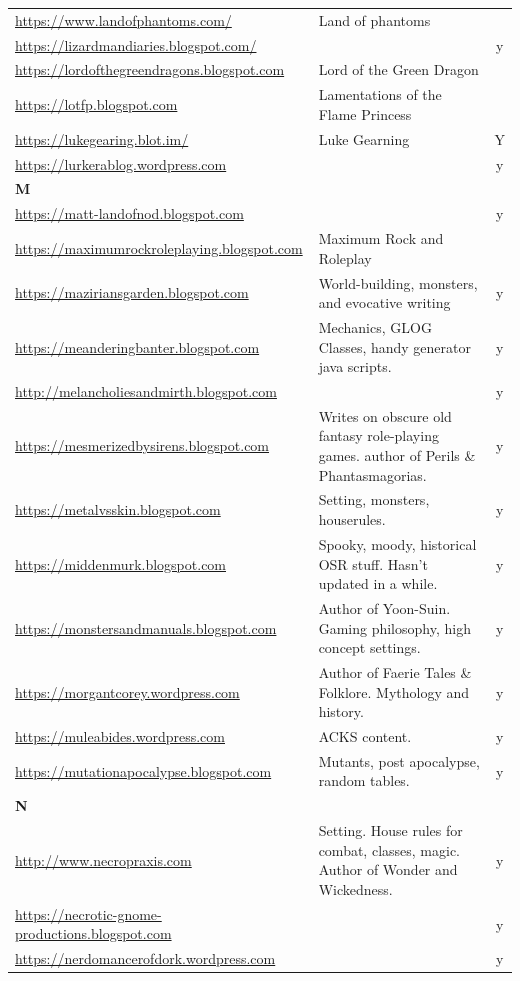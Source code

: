 \documentclass[a4paper, 11pt, twoside]{article}
\begin{document}
\begin{longtable}{p{6cm}p{8cm}c}
\url{https://www.landofphantoms.com/} & Land of phantoms & \\
\url{https://lizardmandiaries.blogspot.com/} &  & y\\
\url{https://lordofthegreendragons.blogspot.com} & Lord of the Green Dragon & \\
\url{https://lotfp.blogspot.com} & Lamentations of the Flame Princess & \\
\url{https://lukegearing.blot.im/} & Luke Gearning & Y\\
\url{https://lurkerablog.wordpress.com} &  & y\\
\textbf{M} &  & \\
\url{https://matt-landofnod.blogspot.com} &  & y\\
\url{https://maximumrockroleplaying.blogspot.com} & Maximum Rock and Roleplay & \\
\url{https://maziriansgarden.blogspot.com} & World-building, monsters, and evocative writing & y\\
\url{https://meanderingbanter.blogspot.com} & Mechanics, GLOG Classes, handy generator java scripts. & y\\
\url{http://melancholiesandmirth.blogspot.com} &  & y\\
\url{https://mesmerizedbysirens.blogspot.com} & Writes on obscure old fantasy role-playing games. author of Perils \& Phantasmagorias. & y\\
\url{https://metalvsskin.blogspot.com} & Setting, monsters, houserules. & y\\
\url{https://middenmurk.blogspot.com} & Spooky, moody, historical OSR stuff. Hasn't updated in a while. & y\\
\url{https://monstersandmanuals.blogspot.com} & Author of Yoon-Suin. Gaming philosophy, high concept settings. & y\\
\url{https://morgantcorey.wordpress.com} & Author of Faerie Tales \& Folklore. Mythology and history. & y\\
\url{https://muleabides.wordpress.com} & ACKS content. & y\\
\url{https://mutationapocalypse.blogspot.com} & Mutants, post apocalypse, random tables. & y\\
\textbf{N} &  & \\
\url{http://www.necropraxis.com} & Setting. House rules for combat, classes, magic. Author of Wonder and Wickedness. & y\\
\url{https://necrotic-gnome-productions.blogspot.com} &  & y\\
\url{https://nerdomancerofdork.wordpress.com} &  & y\\

\end{longtable}
\end{document}
